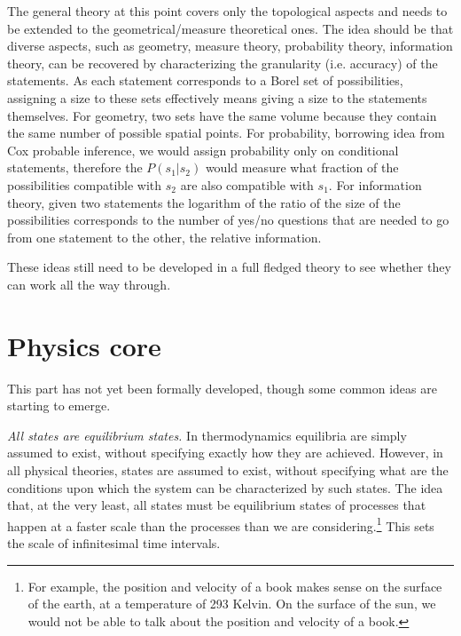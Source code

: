 \documentclass[twocolumn]{article}
\begin{document}
The general theory at this point covers only the topological aspects and needs to be extended to the geometrical/measure theoretical ones. The idea should be that diverse aspects, such as geometry, measure theory, probability theory, information theory, can be recovered by characterizing the granularity (i.e. accuracy) of the statements. As each statement corresponds to a Borel set of possibilities, assigning a size to these sets effectively means giving a size to the statements themselves. For geometry, two sets have the same volume because they contain the same number of possible spatial points. For probability, borrowing idea from Cox probable inference, we would assign probability only on conditional statements, therefore the $P(s_1 | s_2)$ would measure what fraction of the possibilities compatible with $s_2$ are also compatible with $s_1$. For information theory, given two statements the logarithm of the ratio of the size of the possibilities corresponds to the number of yes/no questions that are needed to go from one statement to the other, the relative information.

These ideas still need to be developed in a full fledged theory to see whether they can work all the way through.

\section{Physics core}

This part has not yet been formally developed, though some common ideas are starting to emerge.

\emph{All states are equilibrium states.} In thermodynamics equilibria are simply assumed to exist, without specifying exactly how they are achieved. However, in all physical theories, states are assumed to exist, without specifying what are the conditions upon which the system can be characterized by such states. The idea that, at the very least, all states must be equilibrium states of processes that happen at a faster scale than the processes than we are considering.\footnote{For example, the position and velocity of a book makes sense on the surface of the earth, at a temperature of 293 Kelvin. On the surface of the sun, we would not be able to talk about the position and velocity of a book.} This sets the scale of infinitesimal time intervals.
\end{document}
